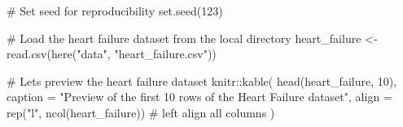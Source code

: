 \documentclass[
  letterpaper,
  DIV=11,
  numbers=noendperiod]{scrartcl}
\newenvironment{Shaded}{\begin{snugshade}}{\end{snugshade}}
\newcommand{\AttributeTok}[1]{\textcolor[rgb]{0.40,0.45,0.13}{#1}}
\newcommand{\CommentTok}[1]{\textcolor[rgb]{0.37,0.37,0.37}{#1}}
\newcommand{\DecValTok}[1]{\textcolor[rgb]{0.68,0.00,0.00}{#1}}
\newcommand{\FunctionTok}[1]{\textcolor[rgb]{0.28,0.35,0.67}{#1}}
\newcommand{\NormalTok}[1]{\textcolor[rgb]{0.00,0.23,0.31}{#1}}
\newcommand{\OtherTok}[1]{\textcolor[rgb]{0.00,0.23,0.31}{#1}}
\newcommand{\SpecialCharTok}[1]{\textcolor[rgb]{0.37,0.37,0.37}{#1}}
\newcommand{\StringTok}[1]{\textcolor[rgb]{0.13,0.47,0.30}{#1}}
\begin{document}
\begin{Shaded}
\begin{Highlighting}[]
\CommentTok{\# Set seed for reproducibility}
\FunctionTok{set.seed}\NormalTok{(}\DecValTok{123}\NormalTok{)}

\CommentTok{\# Load the heart failure dataset from the local directory}
\NormalTok{heart\_failure }\OtherTok{\textless{}{-}} \FunctionTok{read.csv}\NormalTok{(}\FunctionTok{here}\NormalTok{(}\StringTok{"data"}\NormalTok{, }\StringTok{"heart\_failure.csv"}\NormalTok{))}

\CommentTok{\# Let\textquotesingle{}s preview the heart failure dataset}
\NormalTok{knitr}\SpecialCharTok{::}\FunctionTok{kable}\NormalTok{(}
  \FunctionTok{head}\NormalTok{(heart\_failure, }\DecValTok{10}\NormalTok{),}
  \AttributeTok{caption =} \StringTok{"Preview of the first 10 rows of the Heart Failure dataset"}\NormalTok{,}
  \AttributeTok{align =} \FunctionTok{rep}\NormalTok{(}\StringTok{"l"}\NormalTok{, }\FunctionTok{ncol}\NormalTok{(heart\_failure))  }\CommentTok{\# left align all columns}
\NormalTok{)}
\end{Highlighting}
\end{Shaded}
\end{document}
